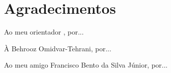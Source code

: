 
\chapter*{Agradecimentos}

Ao meu orientador \mySupervisorName, por...

À Behrooz Omidvar-Tehrani, por...

Ao meu amigo Francisco Bento da Silva Júnior, por...